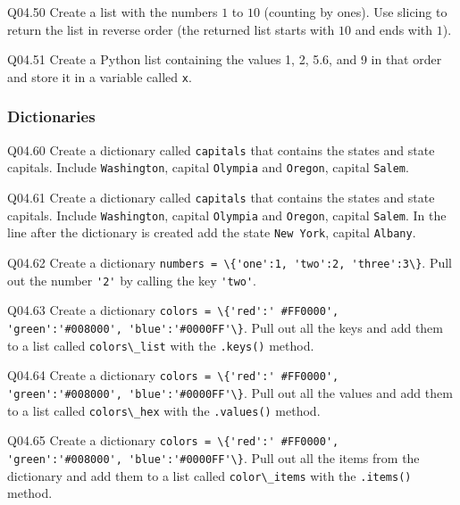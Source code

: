 \documentclass{book}
\newcommand{\passthrough}[1]{#1}
\begin{document}
Q04.50 Create a list with the numbers \(1\) to \(10\) (counting by
ones). Use slicing to return the list in reverse order (the returned
list starts with \(10\) and ends with \(1\)).

Q04.51 Create a Python list containing the values 1, 2, 5.6, and 9 in
that order and store it in a variable called
\passthrough{\lstinline!x!}.
    




    
        \hypertarget{dictionaries}{%
\subsubsection{Dictionaries}\label{dictionaries}}

Q04.60 Create a dictionary called \passthrough{\lstinline!capitals!}
that contains the states and state capitals. Include
\passthrough{\lstinline!Washington!}, capital
\passthrough{\lstinline!Olympia!} and \passthrough{\lstinline!Oregon!},
capital \passthrough{\lstinline!Salem!}.

Q04.61 Create a dictionary called \passthrough{\lstinline!capitals!}
that contains the states and state capitals. Include
\passthrough{\lstinline!Washington!}, capital
\passthrough{\lstinline!Olympia!} and \passthrough{\lstinline!Oregon!},
capital \passthrough{\lstinline!Salem!}. In the line after the
dictionary is created add the state \passthrough{\lstinline!New York!},
capital \passthrough{\lstinline!Albany!}.

Q04.62 Create a dictionary
\passthrough{\lstinline!numbers = \{'one':1, 'two':2, 'three':3\}!}.
Pull out the number \passthrough{\lstinline!'2'!} by calling the key
\passthrough{\lstinline!'two'!}.

Q04.63 Create a dictionary
\passthrough{\lstinline!colors = \{'red':' #FF0000', 'green':'#008000', 'blue':'#0000FF'\}!}.
Pull out all the keys and add them to a list called
\passthrough{\lstinline!colors\_list!} with the
\passthrough{\lstinline!.keys()!} method.

Q04.64 Create a dictionary
\passthrough{\lstinline!colors = \{'red':' #FF0000', 'green':'#008000', 'blue':'#0000FF'\}!}.
Pull out all the values and add them to a list called
\passthrough{\lstinline!colors\_hex!} with the
\passthrough{\lstinline!.values()!} method.

Q04.65 Create a dictionary
\passthrough{\lstinline!colors = \{'red':' #FF0000', 'green':'#008000', 'blue':'#0000FF'\}!}.
Pull out all the items from the dictionary and add them to a list called
\passthrough{\lstinline!color\_items!} with the
\passthrough{\lstinline!.items()!} method.
\end{document}
